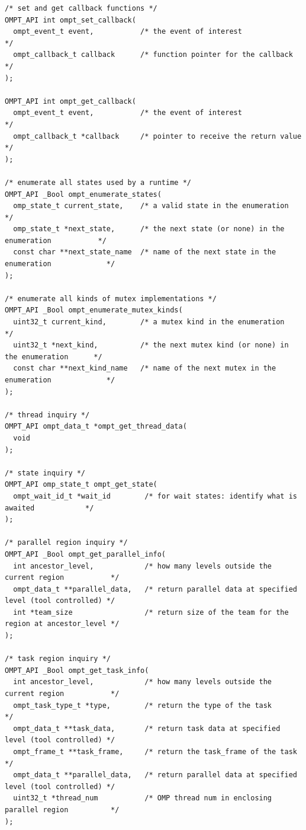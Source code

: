 \documentclass{article}
\begin{document}
\begin{verbatim}
/* set and get callback functions */
OMPT_API int ompt_set_callback( 
  ompt_event_t event,           /* the event of interest                                 */
  ompt_callback_t callback      /* function pointer for the callback                     */
);

OMPT_API int ompt_get_callback(
  ompt_event_t event,           /* the event of interest                                 */
  ompt_callback_t *callback     /* pointer to receive the return value                   */
);

/* enumerate all states used by a runtime */
OMPT_API _Bool ompt_enumerate_states(
  omp_state_t current_state,    /* a valid state in the enumeration                      */
  omp_state_t *next_state,      /* the next state (or none) in the enumeration           */
  const char **next_state_name  /* name of the next state in the enumeration             */
);

/* enumerate all kinds of mutex implementations */
OMPT_API _Bool ompt_enumerate_mutex_kinds(
  uint32_t current_kind,        /* a mutex kind in the enumeration                       */
  uint32_t *next_kind,          /* the next mutex kind (or none) in the enumeration      */
  const char **next_kind_name   /* name of the next mutex in the enumeration             */
);

/* thread inquiry */
OMPT_API ompt_data_t *ompt_get_thread_data(
  void
);

/* state inquiry */
OMPT_API omp_state_t ompt_get_state( 
  ompt_wait_id_t *wait_id        /* for wait states: identify what is awaited            */
);

/* parallel region inquiry */
OMPT_API _Bool ompt_get_parallel_info(
  int ancestor_level,            /* how many levels outside the current region           */
  ompt_data_t **parallel_data,   /* return parallel data at specified level (tool controlled) */
  int *team_size                 /* return size of the team for the region at ancestor_level */
);

/* task region inquiry */
OMPT_API _Bool ompt_get_task_info(
  int ancestor_level,            /* how many levels outside the current region           */
  ompt_task_type_t *type,        /* return the type of the task                          */
  ompt_data_t **task_data,       /* return task data at specified level (tool controlled) */
  ompt_frame_t **task_frame,     /* return the task_frame of the task                    */
  ompt_data_t **parallel_data,   /* return parallel data at specified level (tool controlled) */
  uint32_t *thread_num           /* OMP thread num in enclosing parallel region          */
);


\end{verbatim}
\end{document}
